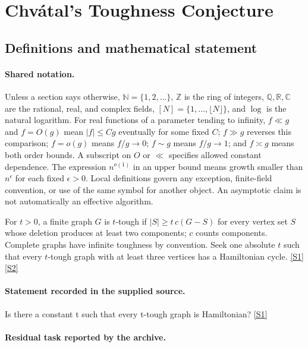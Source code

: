 \documentclass[11pt,a4paper]{article}
\newcommand{\N}{\mathbb{N}}
\newcommand{\Z}{\mathbb{Z}}
\newcommand{\Q}{\mathbb{Q}}
\newcommand{\R}{\mathbb{R}}
\newcommand{\C}{\mathbb{C}}
\newcommand{\sref}[2]{\hyperlink{source:#1:#2}{[S#2]}}
\begin{document}
\section{Chvátal’s Toughness Conjecture}\label{statement}


\subsection{Definitions and mathematical statement}

\paragraph{Shared notation.}Unless a section says otherwise, $\N=\{1,2,\ldots\}$,
$\Z$ is the ring of integers, $\Q,\R,\C$ are the rational, real, and complex
fields, $[N]=\{1,\ldots,\lfloor N\rfloor\}$, and $\log$ is the natural
logarithm. For real functions of a parameter tending to infinity,
$f\ll g$ and $f=O(g)$ mean $|f|\leq Cg$ eventually for some fixed $C$;
$f\gg g$ reverses this comparison; $f=o(g)$ means $f/g\to0$;
$f\sim g$ means $f/g\to1$; and $f\asymp g$ means both order bounds.
A subscript on $O$ or $\ll$ specifies allowed constant dependence.
The expression $n^{o(1)}$ in an upper bound means growth smaller than
$n^\epsilon$ for each fixed $\epsilon>0$. Local definitions govern any
exception, finite-field convention, or use of the same symbol for another
object. An asymptotic claim is not automatically an effective algorithm.



For $t>0$, a finite graph $G$ is $t$-tough if $|S|\geq t\,c(G-S)$ for every vertex set $S$ whose deletion produces at least two components; $c$ counts components. Complete graphs have infinite toughness by convention. Seek one absolute $t$ such that every $t$-tough graph with at least three vertices has a Hamiltonian cycle. \sref{statement}{1} \sref{statement}{2}

\paragraph{Statement recorded in the supplied source.}
Is there a constant t such that every t-tough graph is Hamiltonian? \sref{statement}{1}

\paragraph{Residual task reported by the archive.}
\end{document}
